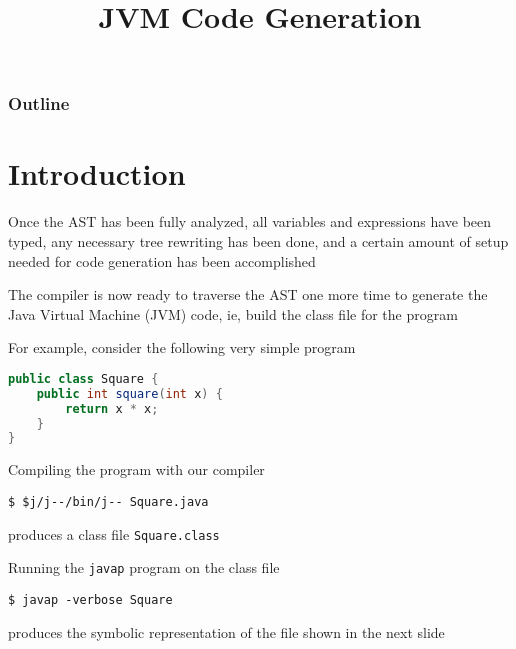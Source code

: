 \documentclass[8pt,a4paper,compress]{beamer}
\title{JVM Code Generation}
\date{}
\begin{document}
\begin{frame}
\vfill
\titlepage
\end{frame}

\begin{frame}
\frametitle{Outline}
\tableofcontents
\end{frame}

\section{Introduction}
\begin{frame}[fragile]
\pause

Once the AST has been fully analyzed, all variables and expressions have been typed, any necessary tree rewriting has been done, and a certain amount of setup needed for code generation has been accomplished

\pause
\bigskip

The compiler is now ready to traverse the AST one more time to generate the Java Virtual Machine (JVM) code, ie, build the class file for the program

\pause
\bigskip

For example, consider the following very simple program
\begin{lstlisting}[language=Java]
public class Square {
    public int square(int x) {
        return x * x;
    }
}
\end{lstlisting}

\pause
\bigskip

Compiling the program with our \jmm compiler
\begin{lstlisting}[language={}]
$ $j/j--/bin/j-- Square.java
\end{lstlisting}
produces a class file \lstinline{Square.class}

\pause
\bigskip

Running the \lstinline{javap} program on the class file
\begin{lstlisting}[language={}]
$ javap -verbose Square
\end{lstlisting}
produces the symbolic representation of the file shown in the next slide
\end{frame}
\end{document}
